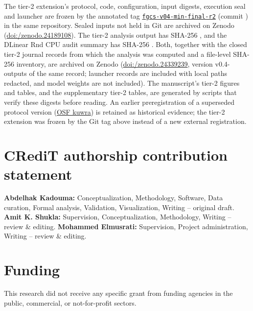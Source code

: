 \documentclass[5p,twocolumn]{elsarticle}
\begin{document}
The tier-2 extension's protocol, code, configuration, input digests,
execution seal and launcher are frozen by the annotated tag
\href{https://github.com/KADOUMAAbdelhak/TimeTrack-Forecasting-Framework/tree/fgcs-v04-min-final-r2}{\texttt{fgcs-v04-min-final-r2}}
(commit \texttt{}) in the same
repository. Sealed inputs not held in Git are archived on Zenodo
(\href{https://doi.org/10.5281/zenodo.24189108}{doi:/\allowbreak zenodo.24189108}).
The tier-2 analysis output has SHA-256
\texttt{},
and the DLinear Rnd CPU audit summary has SHA-256
\texttt{}.
Both, together with the closed tier-2 journal records from which the analysis
was computed and a file-level SHA-256 inventory, are archived on Zenodo
(\href{https://doi.org/10.5281/zenodo.24339239}{doi:/\allowbreak zenodo.24339239},
version v0.4-outputs of the same record; launcher records are included with
local paths redacted, and model weights are not included). The manuscript's
tier-2 figures and tables, and the supplementary tier-2 tables, are
generated by scripts that verify these digests before reading.
An earlier preregistration of a superseded protocol version
(\href{https://osf.io/kuwra}{OSF kuwra}) is retained as historical evidence;
the tier-2 extension was frozen by the Git tag above instead of a new
external registration.

\section*{CRediT authorship contribution statement}

\textbf{Abdelhak Kadouma:} Conceptualization, Methodology, Software, Data curation, Formal analysis, Validation, Visualization, Writing -- original draft. \textbf{Amit K. Shukla:} Supervision, Conceptualization, Methodology, Writing -- review \& editing. \textbf{Mohammed Elmusrati:} Supervision, Project administration, Writing -- review \& editing.


\section*{Funding}

This research did not receive any specific grant from funding agencies in
the public, commercial, or not-for-profit sectors.
\end{document}
